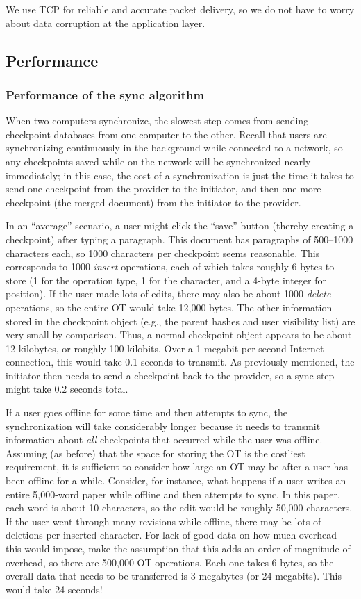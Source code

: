 \documentclass[11pt,titlepage]{article}
\begin{document}
We use TCP for reliable and accurate packet delivery, so we do not
have to worry about data corruption at the application layer.

\subsection{Performance}

\subsubsection{Performance of the sync algorithm}

When two computers synchronize, the slowest step comes from sending
checkpoint databases from one computer to the other. Recall that users
are synchronizing continuously in the background while connected to a
network, so any checkpoints saved while on the network will be
synchronized nearly immediately; in this case, the cost of a
synchronization is just the time it takes to send one checkpoint from
the provider to the initiator, and then one more checkpoint (the
merged document) from the initiator to the provider.

In an ``average'' scenario, a user might click the ``save'' button
(thereby creating a checkpoint) after typing a paragraph. This
document has paragraphs of 500--1000 characters each, so 1000
characters per checkpoint seems reasonable. This corresponds to 1000
\emph{insert} operations, each of which takes roughly 6 bytes to store
(1 for the operation type, 1 for the character, and a 4-byte integer
for position). If the user made lots of edits, there may also be about
1000 \emph{delete} operations, so the entire OT would take 12,000
bytes. The other information stored in the checkpoint object (e.g.,
the parent hashes and user visibility list) are very small by
comparison. Thus, a normal checkpoint object appears to be about 12
kilobytes, or roughly 100 kilobits. Over a 1 megabit per second
Internet connection, this would take 0.1 seconds to transmit. As
previously mentioned, the initiator then needs to send a checkpoint
back to the provider, so a sync step might take 0.2 seconds total.

If a user goes offline for some time and then attempts to sync, the
synchronization will take considerably longer because it needs to
transmit information about \emph{all} checkpoints that occurred while
the user was offline.  Assuming (as before) that the space for storing
the OT is the costliest requirement, it is sufficient to consider how
large an OT may be after a user has been offline for a
while. Consider, for instance, what happens if a user writes an entire
5,000-word paper while offline and then attempts to sync. In this
paper, each word is about 10 characters, so the edit would be roughly
50,000 characters.  If the user went through many revisions while
offline, there may be lots of deletions per inserted character. For
lack of good data on how much overhead this would impose, make the
assumption that this adds an order of magnitude of overhead, so there
are 500,000 OT operations. Each one takes 6 bytes, so the overall data
that needs to be transferred is 3 megabytes (or 24 megabits). This
would take 24 seconds!
\end{document}
